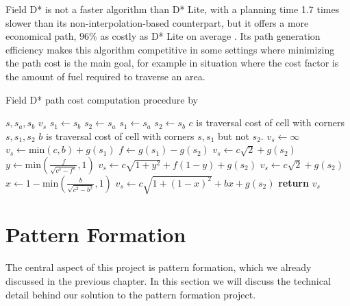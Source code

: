 Field D* is not a faster algorithm than D* Lite, with a planning time 1.7 times slower than its non-interpolation-based counterpart, 
but it offers a more economical path, $96\%$ as costly as D* Lite on average \autocite{DF06}. Its path generation efficiency makes
this algorithm competitive in some settings where minimizing the path cost is the main goal, for example in situation where the 
cost factor is the amount of fuel required to traverse an area.

\begin{algorithm}
	\algrenewcommand{}
	\algrenewcommand{}
	\caption{Field D* path cost computation procedure by \autocite{DF06}}\label{alg:fds-cc}
	\begin{algorithmic}[1]
		\Require $s, s_a, s_b$
		\Ensure $v_s$ 
		\State $s_1 \gets s_b$ 
		\State $s_2 \gets s_a$
		\Else
		\State $s_1 \gets s_a$ 
		\State $s_2 \gets s_b$ 
		\EndIf
		\State $c$ is traversal cost of cell with corners $s, s_1, s_2$ 
		\State $b$ is traversal cost of cell with corners $s, s_1$ but not $s_2$.
		\State $v_s \gets \infty$
		\State $v_s \gets \mathrm{min}(c,b) + g(s_1)$
		\Else
		\State $f \gets g(s_1) - g(s_2)$ 
		\State $v_s \gets c \sqrt{2} + g(s_2)$
		\Else
		\State $y \gets \mathrm{min}\left(\frac{f}{\sqrt{c^s - f^s}}, 1\right)$
		\State $v_s \gets c \sqrt{1 + y^2} + f(1 - y) + g(s_2)$
		\EndIf
		\Else
		\State $v_s \gets c \sqrt{2} + g(s_2)$
		\Else 
		\State $x \gets 1 - \mathrm{min}\left(\frac{b}{\sqrt{c^2 - b^2}},1\right)$
		\State $v_s \gets c \sqrt{1 + (1-x)^2} + bx + g(s_2)$
		\EndIf
		\EndIf
		\EndIf
		\State \textbf{return} $v_s$
	\end{algorithmic}
\end{algorithm}

\newpage

\section{Pattern Formation}

The central aspect of this project is pattern formation, which we already
discussed in the previous chapter. In this section we will discuss the technical
detail behind our solution to the pattern formation project. 


